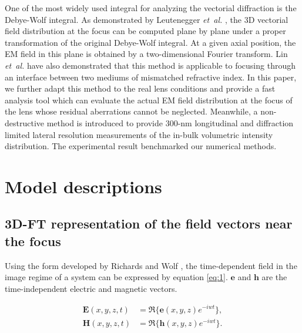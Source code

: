 \documentclass[9pt,twocolumn,twoside]{osajnl}
\begin{document}
One of the most widely used integral for analyzing the vectorial diffraction is the Debye-Wolf integral. As demonstrated by Leutenegger \emph{et~al.} \cite{leutenegger2006fast}, the 3D vectorial field distribution at the focus can be computed plane by plane under a proper transformation of the original Debye-Wolf integral. At a given axial position, the EM field in this plane is obtained by a two-dimensional Fourier transform. Lin \emph{et~al.} \cite{Lin2012} have also demonstrated that this method is applicable to focusing through an interface between two mediums of mismatched refractive index. In this paper, we further adapt this method to the real lens conditions and provide a fast analysis tool which can evaluate the actual EM field distribution at the focus of the lens whose residual aberrations cannot be neglected. Meanwhile, a non-destructive method is introduced to provide 300-nm longitudinal and diffraction limited lateral resolution measurements of the in-bulk volumetric intensity distribution. The experimental result benchmarked our numerical methods. 




\section{Model descriptions} \label{section:2}
\subsection{3D-FT representation of the field vectors near the focus}
Using the form developed by Richards and Wolf \cite{richards1959electromagnetic}, the time-dependent field in the image regime of a system can be expressed by equation \eqref{eq:1}. $\textbf{e}$ and $\textbf{h}$ are the time-independent electric and magnetic vectors.

\begin{equation}\label{eq:1}
	\begin{aligned}
		\textbf{E}(x, y, z, t)&=\Re\{\textbf{e}(x, y, z)e^{-iwt}\},\\
		\textbf{H}(x, y, z, t)&=\Re\{\textbf{h}(x, y, z)e^{-iwt}\}.
	\end{aligned}	
\end{equation}
\end{document}
